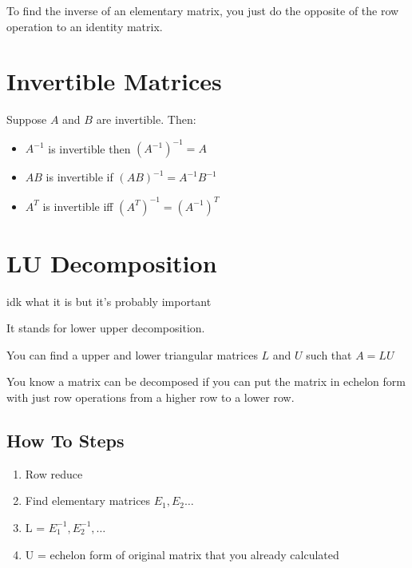 \documentclass[fleqn]{report}
\begin{document}
To find the inverse of an elementary matrix, you just do the 
opposite of the row operation to an identity matrix.

\section{Invertible Matrices}
Suppose $A$ and $B$ are invertible. Then:
\begin{itemize}
    \item
    $A^{-1}$ is invertible then $(A^{-1})^{-1} = A$
    \item
    $AB$ is invertible if $(AB)^{-1} = A^{-1} B^{-1}$
    \item
    $A^T$ is invertible iff $(A^T)^{-1} = (A^{-1})^{T}$
\end{itemize}


\section{LU Decomposition}
idk what it is but it's probably important

It stands for lower upper decomposition.

You can find a upper and lower triangular matrices $L$ and $U$
such that $A = LU$

You know a matrix can be decomposed if you can put the matrix
in echelon form with just row operations from a higher row to 
a lower row. 

\subsection{How To Steps}
\begin{enumerate}
    \item 
    Row reduce
    \item
    Find elementary matrices $E_1, E_2 \ldots$
    \item 
    L = $E^{-1}_1, E^{-1}_2, \ldots$
    \item 
    U = echelon form of original matrix that you already calculated
\end{enumerate}
\end{document}
